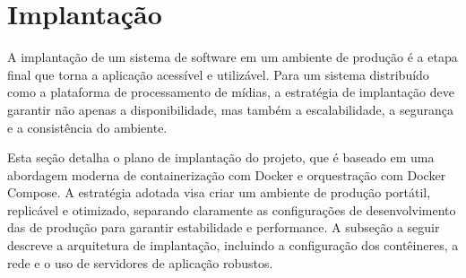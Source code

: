 \section{Implantação}
\label{sec:implantacao}

A implantação de um sistema de software em um ambiente de produção é a etapa final que torna a aplicação acessível e utilizável. Para um sistema distribuído como a plataforma de processamento de mídias, a estratégia de implantação deve garantir não apenas a disponibilidade, mas também a escalabilidade, a segurança e a consistência do ambiente.

Esta seção detalha o plano de implantação do projeto, que é baseado em uma abordagem moderna de containerização com Docker e orquestração com Docker Compose. A estratégia adotada visa criar um ambiente de produção portátil, replicável e otimizado, separando claramente as configurações de desenvolvimento das de produção para garantir estabilidade e performance. A subseção a seguir descreve a arquitetura de implantação, incluindo a configuração dos contêineres, a rede e o uso de servidores de aplicação robustos.
